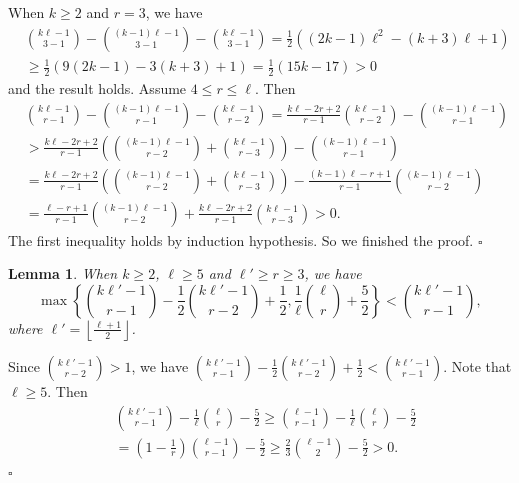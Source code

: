 \documentclass[12pt]{article}%
\newtheorem{lemma}[theorem]{Lemma}
\newenvironment{proof}{{\noindent\it Proof.}}{\hfill $\square$\par}
\newcommand{\lf}{\left\lfloor}
\newcommand{\rf}{\right\rfloor}
\newcommand{\lchuto}{\lf\frac{\ell+1}{2}\rf}
\begin{document}
\begin{proof}
 When $k\geq 2$ and $r=3$, we have
     \begin{equation*}
        \begin{aligned}
            &\binom{k\ell-1}{3-1}-\binom{(k-1)\ell-1}{3-1}-\binom{k\ell-1}{3-1}=\frac{1}{2}\left((2k-1)\ell^2-(k+3)\ell+1\right)\\
            &\geq \frac{1}{2}\left(9(2k-1)-3(k+3)+1\right)
            =\frac{1}{2}(15k-17)>0
        \end{aligned}
    \end{equation*}
    and the result holds. Assume $4\leq r\leq \ell$. %
    Then
    \begin{equation*}
        \begin{aligned}
            &\binom{k\ell-1}{r-1}-\binom{(k-1)\ell-1}{r-1}-\binom{k\ell-1}{r-2}%
            =\frac{k\ell-2r+2}{r-1}\binom{k\ell-1}{r-2}-\binom{(k-1)\ell-1}{r-1}\\
            &>\frac{k\ell-2r+2}{r-1}\left(\binom{(k-1)\ell-1}{r-2}+\binom{k\ell-1}{r-3}\right)-\binom{(k-1)\ell-1}{r-1}\\
            &=\frac{k\ell-2r+2}{r-1}\left(\binom{(k-1)\ell-1}{r-2}+\binom{k\ell-1}{r-3}\right)
            -\frac{(k-1)\ell-r+1}{r-1}\binom{(k-1)\ell-1}{r-2}\\
            &=\frac{\ell-r+1}{r-1}\binom{(k-1)\ell-1}{r-2}+\frac{k\ell-2r+2}{r-1}\binom{k\ell-1}{r-3}>0.
        \end{aligned}
    \end{equation*}The first inequality holds by induction hypothesis. So we finished the proof.
\end{proof}

 \begin{lemma}\label{last}
When $k\geq 2$, $\ell\geq 5$ and $\ell'\geq  r\geq 3$, we have
$$\max\left\{\binom{k\ell'-1}{r-1}-\frac{1}{2}\binom{k\ell'-1}{r-2}+\frac{1}{2},\frac{1}{\ell}\binom{\ell}{r}+\frac{5}{2}\right\}<\binom{k\ell'-1}{r-1},$$ where $\ell'=\lchuto$.
\end{lemma}
\begin{proof}
Since $\binom{k\ell'-1}{r-2}>1$, we have $\binom{k\ell'-1}{r-1}-\frac{1}{2}\binom{k\ell'-1}{r-2}+\frac{1}{2}<\binom{k\ell'-1}{r-1}$. Note that $\ell\geq 5$. Then
\begin{equation*}
    \begin{aligned}
      &\binom{k\ell'-1}{r-1}-\frac{1}{\ell}\binom{\ell}{r}-\frac{5}{2}\geq  \binom{\ell-1}{r-1}-\frac{1}{\ell}\binom{\ell}{r}-\frac{5}{2}\\
      &=(1-\frac{1}{r})\binom{\ell-1}{r-1}-\frac{5}{2}
      \geq \frac{2}{3}\binom{\ell-1}{2}-\frac{5}{2}>0.
    \end{aligned}
\end{equation*}
\end{proof}
\end{document}
